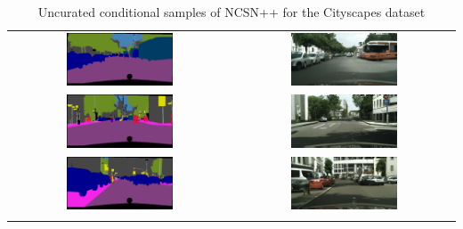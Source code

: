 \begin{longtable}{cc}
    \includegraphics[width=0.50\textwidth]{Chapters/figures/appendix/cityscapes/frankfurt_000001_058057_leftImg8bit_mask.png} & \includegraphics[width=0.50\textwidth]{Chapters/figures/appendix/cityscapes/frankfurt_000001_058057_leftImg8bit_sample.png} \\
    \includegraphics[width=0.50\textwidth]{Chapters/figures/appendix/cityscapes/frankfurt_000001_062793_leftImg8bit_mask.png} & \includegraphics[width=0.50\textwidth]{Chapters/figures/appendix/cityscapes/frankfurt_000001_062793_leftImg8bit_sample.png} \\
    \includegraphics[width=0.50\textwidth]{Chapters/figures/appendix/cityscapes/frankfurt_000001_080091_leftImg8bit_mask.png} & \includegraphics[width=0.50\textwidth]{Chapters/figures/appendix/cityscapes/frankfurt_000001_080091_leftImg8bit_sample.png} \\
    \caption{Uncurated conditional samples of NCSN++ for the Cityscapes dataset}
\end{longtable}
